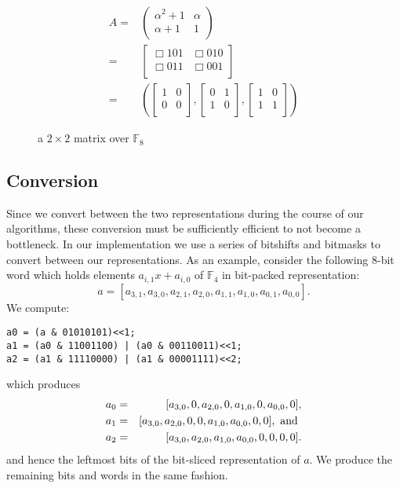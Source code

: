 \documentclass{sig-alternate}
\newcommand{\ring}[1]{\mathbb{#1}}
\newcommand{\F}{\ensuremath{\ring{F}}\xspace}
\begin{document}
\begin{figure}[ht]
\begin{eqnarray*}
A =& \left(\begin{array}{cc}
		  \alpha^2 + 1 & \alpha \\
		  \alpha + 1 & 1 \\
       \end{array}\right)\\
 = & \left[\begin{array}{cc}\Box101&\Box010\\
                                  \Box011&\Box001\\
     \end{array}\right]\\
 = & \left( \left[\begin{array}{cc}
1&0\\
0&0\\
\end{array}\right], \left[\begin{array}{cc}
0&1\\
1&0\\
\end{array}\right],\left[\begin{array}{cccc}
1&0\\
1&1\\
\end{array}\right]\right)
\end{eqnarray*}
\caption{a $2 \times 2$ matrix over $\F_{8}$}
\label{fig:example}
\end{figure}

\subsection{Conversion}

Since we convert between the two representations during the course of our algorithms, these conversion must be sufficiently efficient to not become a bottleneck. In our implementation we use a series of bitshifts and bitmasks to convert between our representations. As an example, consider the following 8-bit word which holds elements $a_{i,1}x + a_{i,0}$ of $\F_4$ in bit-packed representation:  $$a = [a_{3,1},a_{3,0},a_{2,1},a_{2,0},a_{1,1},a_{1,0},a_{0,1},a_{0,0}].$$ We compute:
\begin{lstlisting}
a0 = (a & 01010101)<<1; 
a1 = (a0 & 11001100) | (a0 & 00110011)<<1; 
a2 = (a1 & 11110000) | (a1 & 00001111)<<2; 
\end{lstlisting}
which produces 
\begin{eqnarray*}
a_0 &=& [a_{3,0},0,a_{2,0},0,a_{1,0},0,a_{0,0},0],\\
a_1 &=& [a_{3,0},a_{2,0},0,0,a_{1,0},a_{0,0},0,0], \textnormal{ and }\\
a_2 &=& [a_{3,0},a_{2,0},a_{1,0},a_{0,0},0,0,0,0].
\end{eqnarray*}
and hence the leftmost bits of the bit-sliced representation of $a$. We produce the remaining bits and words in the same fashion.
\end{document}
